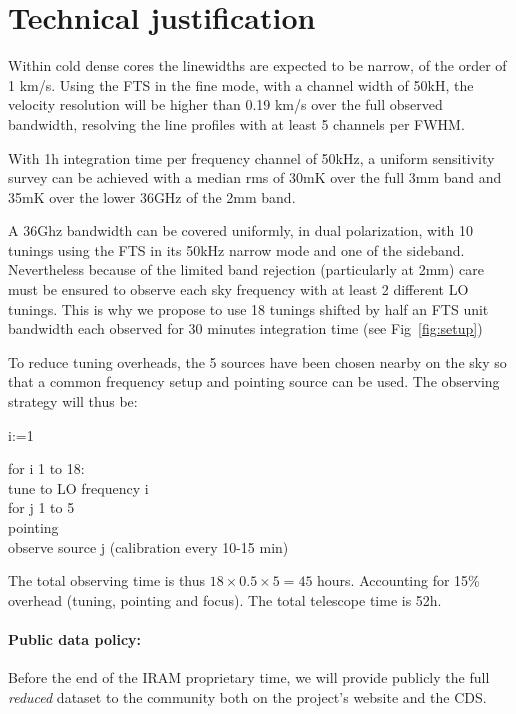 \section{Technical justification}
 Within cold dense cores the linewidths are expected to be narrow, of the order of 1 km/s. Using the FTS in the fine mode, with a channel width of 50kH, the velocity resolution will be higher than 0.19 km/s over the full observed bandwidth, resolving the line profiles with at least 5 channels per FWHM.

With 1h integration time per frequency channel of 50kHz, a uniform sensitivity survey can be achieved with a median rms of 30mK over the full 3mm band and 35mK over the lower 36GHz of the 2mm band. 

A 36Ghz bandwidth can be covered uniformly, in dual polarization, with 10 tunings using the FTS in its 50kHz narrow mode and one of the sideband. Nevertheless because of the limited band rejection (particularly at 2mm) care must be ensured to observe each sky frequency with at least 2 different LO tunings. This is why we propose to use 18 tunings shifted by half an FTS unit bandwidth each observed for 30 minutes integration time (see Fig~\ref{fig:setup})

To reduce tuning overheads, the 5 sources have been chosen nearby on the sky so that a common frequency setup and pointing source can be used. The observing strategy will thus be: 
\begin{program}
  \FOR i:=1  \DO
\end{program}
\noindent for i 1 to 18:\\
\indent  tune to LO frequency i\\
\indent  for j 1 to 5\\
\indent pointing\\
\indent observe source j (calibration every 10-15 min)

The total observing time is thus $18\times0.5\times5=45$ hours. Accounting for 15\% overhead (tuning, pointing and focus). The total telescope time is 52h.
   
\paragraph{Public data policy:} Before the end of the IRAM proprietary time, we will provide publicly the full \emph{reduced} dataset to the community both on the project's website and the CDS.
  
  
  
  
  